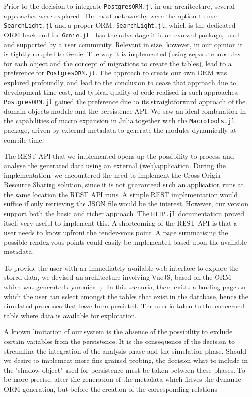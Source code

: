 \documentclass{juliacon}
\begin{document}
Prior to the decision to integrate \texttt{PostgresORM.jl} in our architecture, several approaches were explored. The most noteworthy were the option to use \texttt{SearchLight.jl} and a proper ORM. \texttt{SearchLight.jl}, which is the dedicated ORM back end for \mbox{\texttt{Genie.jl} \cite{genie}} has the advantage it is an evolved package, used and supported by a user community. Relevant in size, however, in our opinion it is tightly coupled to Genie. The way it is implemented (using separate modules for each object and the concept of migrations to create the tables), lead to a preference for \texttt{PostgresORM.jl}. The approach to create our own ORM was explored profoundly, and lead to the conclusion to cease that approach due to development time cost, and typical quality of code realised in such approaches. \texttt{PostgresORM.jl} gained the preference due to its straightforward approach of the domain objects module and the persistence API. We saw an ideal combination in the capabilities of macro expansion in Julia together with the \texttt{MacroTools.jl} package, driven by external metadata to generate the modules dynamically at compile time.\vskip 6pt

The REST API that we implemented opens up the possibility to process and analyse the generated data using an external (web)application. During the implementation, we encountered the need to implement the Cross-Origin Resource Sharing solution, since it is not guaranteed such an application runs at the same location the REST API runs. A simple REST implementation would suffice if only retrieving the JSON file would be the interest. However, our version support both the basic and richer approach. The \texttt{HTTP.jl} documentation proved itself very useful to implement this. A shortcoming of the REST API is that a user needs to know upfront the rendez-vous point. A page summarising the possible rendez-vous points could easily be implemented based upon the available metadata.\vskip 6pt

To provide the user with an immediately available web interface to explore the stored data, we devised an architecture involving VueJS, based on the ORM which was generated dynamically. In this scenario, there exists a landing page on which the user can select amongst the tables that exist in the database, hence the simulated processes that have been persisted. The user is taken to the concerned table where data is available for exploration. \vskip 6pt

A known limitation of our system is the absence of the possibility to exclude certain variables from the persistence. It is the consequence of the decision to streamline the integration of the analysis phase and the simulation phase. Should we desire to implement more fine-grained probing, the decision what to include in the "shadow-object" used for persistence must be taken between these phases. To be more precise, after the generation of the metadata which drives the dynamic ORM generation, but before the creation of the corresponding relations.\vskip 6pt
\end{document}
